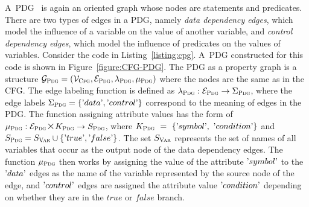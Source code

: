 A~PDG~\cite{CPG-yamaguchi2014modeling} is again an oriented graph whose nodes are statements and predicates. There are two types of edges in a PDG, namely \textit{data dependency edges}, which model the influence of a variable on the value of another variable, and \textit{control dependency edges}, which model the influence of predicates on the values of variables. Consider the code in Listing~\ref{listing:cpg}. A~PDG constructed for this code is shown in Figure~\ref{figure:CFG-PDG}. The PDG as a property graph is a structure $\mathcal{G}_{\textsc{Pdg}} = ( \mathcal{V}_{\textsc{Cfg}}, \mathcal{E}_{\textsc{Pdg}}, \lambda_{\textsc{Pdg}}, \mu_{\textsc{Pdg}} )$ where the nodes are the same as in the CFG. The edge labeling function is defined as $\lambda_{\textsc{Pdg}} : \mathcal{E}_{\textsc{Pdg}} \rightarrow \Sigma_{\textsc{Pdg}}$, where the edge labels $\Sigma_{\textsc{Pdg}} = \{\textrm'data\textrm', \textrm'control\textrm'\}$ correspond to the meaning of edges in the PDG. The function assigning attribute values has the form of $\mu_{\textsc{Pdg}}: \mathcal{E_{\textsc{Pdg}}} \bigtimes K_{\textsc{Pdg}} \rightarrow S_{\textsc{Pdg}}$, where $K_{\textsc{Pdg}}~=~\{\textrm'symbol\textrm',~\textrm'condition\textrm'\}$ and $S_{\textsc{Pdg}} = S_{\textsc{Var}} \cup \{\textrm'true\textrm', \textrm'false\textrm'\} $. The set $S_{\textsc{Var}}$ represents the set of names of all variables that occur as the output node of the data dependency edges. The function $\mu_{\textsc{Pdg}}$ then works by assigning the value of the attribute $\textrm'symbol\textrm'$ to the $\textrm'data\textrm'$ edges as the name of the variable represented by the source node of the edge, and $\textrm'control\textrm'$ edges are assigned the attribute value $\textrm'condition\textrm'$ depending on whether they are in the $true$ or $false$ branch. 

